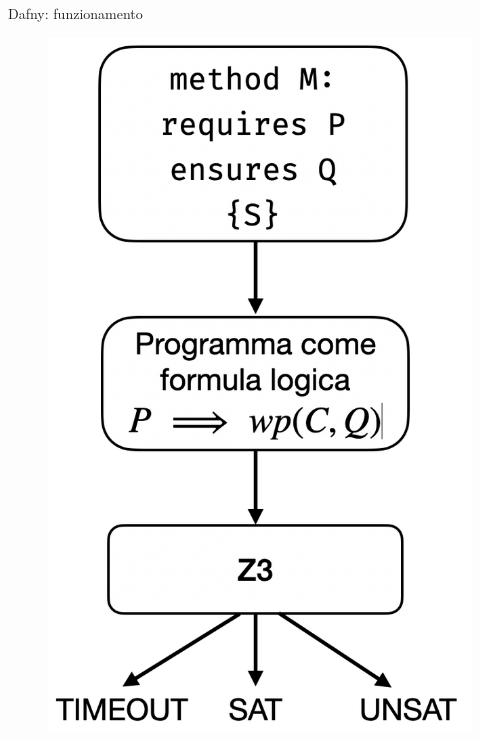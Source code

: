 \documentclass{beamer}
\begin{document}
\begin{frame}{Dafny: funzionamento}
{\begin{figure}
            \includegraphics[scale=0.4]{./assets/images/mechanism.png}
        \end{figure}
    }
\end{frame}
\end{document}
